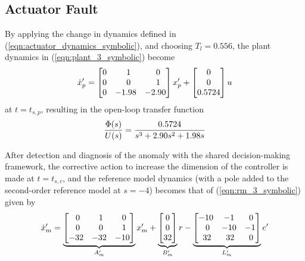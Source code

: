 \subsection{Actuator Fault}
By applying the change in dynamics defined in (\ref{eqn:actuator_dynamics_symbolic}), and choosing $T_l = 0.556$, the plant dynamics in (\ref{eqn:plant_3_symbolic}) become
\begin{equation}
	\dot{x}_p' = \begin{bmatrix}
		0 & \hfil 1 & \hfil 0\\ 0 & \hfil 0 & \hfil 1 \\ 0 & -1.98 & -2.90
	\end{bmatrix} x_p' + \begin{bmatrix}
		0 \\ 0 \\ 0.5724
	\end{bmatrix} u
	\label{eqn:plant_3}
\end{equation}
\noindent at $t = t_{s,p}$, resulting in the open-loop transfer function
\begin{equation}
		\frac{\Phi(s)}{U(s)} = \frac{0.5724}{s^3 + 2.90s^2 + 1.98s}\\
\end{equation}

After detection and diagnosis of the anomaly with the shared decision-making framework, the corrective action to increase the dimension of the controller is made at $t = t_{s,c}$, and the reference model dynamics (with a pole added to the second-order reference model at $s = -4$) becomes that of (\ref{eqn:rm_3_symbolic}) given by
\begin{equation}
	\dot{x}_m' = \underbrace{\begin{bmatrix}
		\hfil 0 & \hfil 1 & \hfil 0\\ \hfil 0 & \hfil 0 & \hfil 1 \\ -32 & -32 & -10
	\end{bmatrix}}_{A_m'} x_m' + \underbrace{\begin{bmatrix}
		0 \\ 0 \\ 32
	\end{bmatrix}}_{B_m'} r - \underbrace{\begin{bmatrix}
		-10 & -1 & \hfil 0 \\ \hfil 0 & -10 & -1 \\ \hfil 32 & \hfil 32 & \hfil 0
	\end{bmatrix}}_{L_m'} e'
	\label{eqn:rm_3}
\end{equation}

